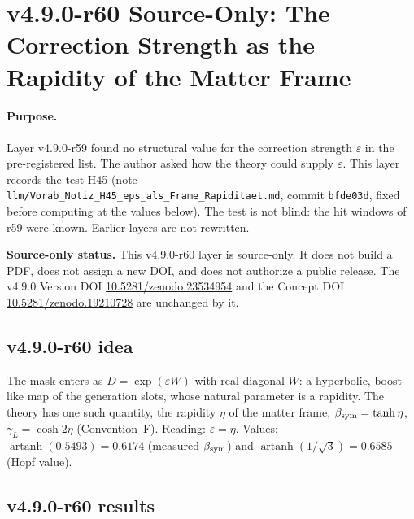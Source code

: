 \clearpage
\section*{v4.9.0-r60 Source-Only: The Correction Strength as the Rapidity of the Matter Frame}
\label{sec:v490-r60-eps-rapidity}

\paragraph{Purpose.}
Layer v4.9.0-r59 found no structural value for the correction strength \(\varepsilon\) in the pre-registered list.  The author asked how the theory could supply
\(\varepsilon\).  This layer records the test H45 (note \texttt{llm/Vorab\_Notiz\_H45\_eps\_als\_Frame\_Rapiditaet.md}, commit \texttt{bfde03d}, fixed before computing at
the values below).  The test is not blind: the hit windows of r59 were known.  Earlier layers are not rewritten.

\noindent\textbf{Source-only status.}
This v4.9.0-r60 layer is source-only.  It does not build a PDF, does not assign a new DOI,
and does not authorize a public release.  The v4.9.0 Version DOI
\href{https://doi.org/10.5281/zenodo.23534954}{10.5281/zenodo.23534954} and the Concept DOI
\href{https://doi.org/10.5281/zenodo.19210728}{10.5281/zenodo.19210728} are unchanged by it.

\subsection*{v4.9.0-r60 idea}
\label{subsec:v490-r60-idea}

The mask enters as \(D=\exp(\varepsilon W)\) with real diagonal \(W\): a hyperbolic, boost-like map of the generation slots, whose natural parameter is a rapidity.  The
theory has one such quantity, the rapidity \(\eta\) of the matter frame, \(\beta_{\rm sym}=\tanh\eta\), \(\gamma_L=\cosh2\eta\) (Convention~F).  Reading:
\(\varepsilon=\eta\).  Values: \(\operatorname{artanh}(0.5493)=0.6174\) (measured \(\beta_{\rm sym}\)) and \(\operatorname{artanh}(1/\sqrt3)=0.6585\) (Hopf value).

\subsection*{v4.9.0-r60 results}
\label{subsec:v490-r60-results}

